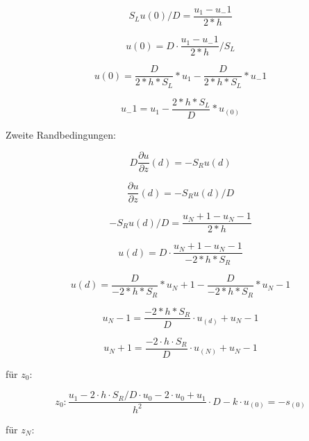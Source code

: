 \begin{equation}
	S_Lu(0)/D = \frac{u_1-u_-1}{2*h}
\end{equation}

\begin{equation}
	u(0) = D\cdot \frac{u_1-u_-1}{2*h}/S_L
\end{equation}

\begin{equation}
	u(0) = \frac{D}{2*h*S_L} * u_1 - \frac{D}{2*h*S_L} * u_-1
\end{equation}

\begin{equation}
	u_-1 = u_1 - \frac{2*h*S_L}{D} * u_(0)
\end{equation}

Zweite Randbedingungen:

\begin{equation}
	D\frac{\partial u}{\partial z}(d)=-S_Ru(d)
\end{equation}

\begin{equation}
	\frac{\partial u}{\partial z}(d)=-S_Ru(d)/D
\end{equation}

\begin{equation}
	-S_Ru(d)/D = \frac{u_N+1-u_N-1}{2*h}
\end{equation}

\begin{equation}
	u(d) = D\cdot \frac{u_N+1-u_N-1}{-2*h*S_R}
\end{equation}

\begin{equation}
	u(d) = \frac{D}{-2*h*S_R} * u_N+1 - \frac{D}{-2*h*S_R} * u_N-1
\end{equation}

\begin{equation}
	u_N-1 = \frac{-2*h*S_R}{D} \cdot u_(d) + u_N-1
\end{equation}

\begin{equation}
	u_N+1 = \frac{-2\cdot h\cdot S_R}{D} \cdot u_(N) + u_N-1
\end{equation}


für $z_0$:

\begin{equation}
	z_0: \frac{u_1-2\cdot h\cdot S_R/D\cdot u_0-2\cdot u_0+u_1}{h^2} \cdot D-k\cdot u_(0) = -s_(0)
\end{equation}


für $z_N$:

